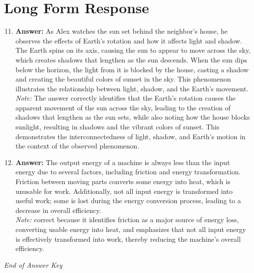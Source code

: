\documentclass[12pt]{article}
\begin{document}
\section*{Long Form Response}
\begin{enumerate}[label=\arabic*.]
\setcounter{enumi}{10}
\item \textbf{Answer:} As Alex watches the sun set behind the neighbor's house, he observes the effects of Earth's rotation and how it affects light and shadow. The Earth spins on its axis, causing the sun to appear to move across the sky, which creates shadows that lengthen as the sun descends. When the sun dips below the horizon, the light from it is blocked by the house, casting a shadow and creating the beautiful colors of sunset in the sky. This phenomenon illustrates the relationship between light, shadow, and the Earth's movement.
\\ \textit{Note:} The answer correctly identifies that the Earth's rotation causes the apparent movement of the sun across the sky, leading to the creation of shadows that lengthen as the sun sets, while also noting how the house blocks sunlight, resulting in shadows and the vibrant colors of sunset. This demonstrates the interconnectedness of light, shadow, and Earth's motion in the context of the observed phenomenon.
\item \textbf{Answer:} The output energy of a machine is always less than the input energy due to several factors, including friction and energy transformation. Friction between moving parts converts some energy into heat, which is unusable for work. Additionally, not all input energy is transformed into useful work; some is lost during the energy conversion process, leading to a decrease in overall efficiency.
\\ \textit{Note:} correct because it identifies friction as a major source of energy loss, converting usable energy into heat, and emphasizes that not all input energy is effectively transformed into work, thereby reducing the machine's overall efficiency.
\end{enumerate}

\vfill
\noindent\textit{End of Answer Key}
\end{document}
